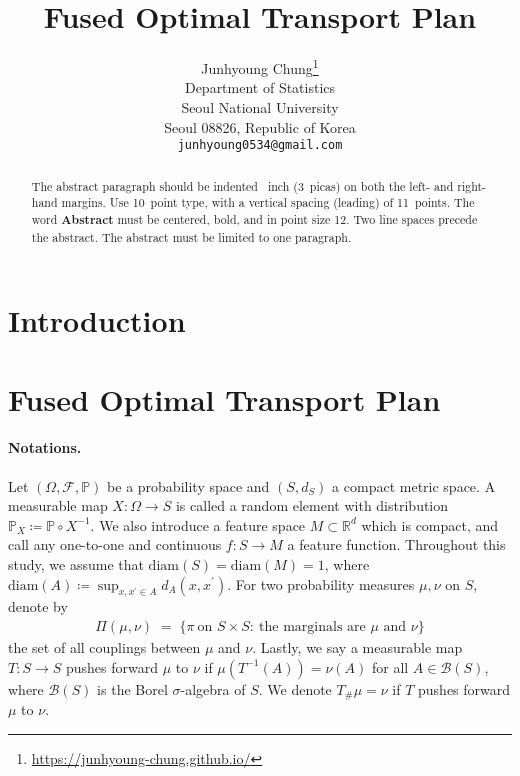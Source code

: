 \documentclass{article}
\title{Fused Optimal Transport Plan}
\author{%
  Junhyoung Chung\thanks{\href{https://junhyoung-chung.github.io/}{https://junhyoung-chung.github.io/}} \\
  Department of Statistics\\
  Seoul National University\\
  Seoul 08826, Republic of Korea \\
  \texttt{junhyoung0534@gmail.com} \\
}
\begin{document}
\maketitle


\begin{abstract}
  The abstract paragraph should be indented ~inch (3~picas) on
  both the left- and right-hand margins. Use 10~point type, with a vertical
  spacing (leading) of 11~points.  The word \textbf{Abstract} must be centered,
  bold, and in point size 12. Two line spaces precede the abstract. The abstract
  must be limited to one paragraph.
\end{abstract}


\section{Introduction}

\section{Fused Optimal Transport Plan}

\paragraph{Notations.}
Let $(\Omega,\mathcal{F},\mathbb{P})$ be a probability space and $(S,d_S)$ a compact metric space. 
A measurable map $X:\Omega\to S$ is called a random element with distribution $\mathbb{P}_X\coloneqq\mathbb{P}\circ X^{-1}$.
We also introduce a feature space $M\subset\mathbb{R}^d$ which is compact, and call any one-to-one and continuous $f:S\to M$ a feature function. Throughout this study, we assume that $\mathrm{diam}(S) = \mathrm{diam}(M) = 1$, where $\mathrm{diam}(A) \coloneqq \sup_{x,x^\prime \in A}d_A(x,x^\prime)$. For two probability measures $\mu,\nu$ on $S$, denote by
\begin{align*}
\Pi(\mu,\nu)\;=\;\{\pi\ \text{on }S\times S:\ \text{the marginals are }\mu\text{ and }\nu\}
\end{align*}
the set of all couplings between $\mu$ and $\nu$. Lastly, we say a measurable map $T: S \to S$ pushes forward $\mu$ to $\nu$ if $\mu(T^{-1}(A)) = \nu(A)$ for all $A \in \mathcal{B}(S)$, where $\mathcal{B}(S)$ is the Borel $\sigma$-algebra of $S$. We denote $T_{\#}\mu = \nu$ if $T$ pushes forward $\mu$ to $\nu$.
\end{document}
